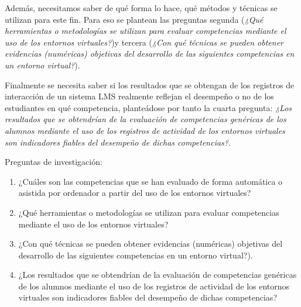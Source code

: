 Además, necesitamos saber de qué forma lo hace, qué métodos y técnicas se utilizan para este fin. Para eso se plantean las preguntas segunda (\emph{¿Qué herramientas o metodologías se utilizan para evaluar competencias mediante el uso de los entornos virtuales?})y tercera (\emph{¿Con qué técnicas se pueden obtener evidencias (numéricas) objetivas del desarrollo de las siguientes competencias en un entorno virtual?}).

Finalmente se necesita saber si los resultados que se obtengan de los registros de interacción de un sistema LMS realmente reflejan el desempeño o no de los estudiantes en qué competencia, planteádose por tanto la cuarta pregunta: \emph{¿Los resultados que se obtendrían de la evaluación de competencias genéricas de los alumnos mediante el uso de los registros de actividad de los entornos virtuales son indicadores fiables del desempeño de dichas competencias?}.

\bigskip
Preguntas de investigación:
\begin{enumerate}
\item ¿Cuáles son las competencias que se han evaluado de forma automática o asistida por ordenador a partir del uso de los entornos virtuales?
\item ¿Qué herramientas o metodologías se utilizan para evaluar competencias mediante el uso de los entornos virtuales?
\item ¿Con qué técnicas se pueden obtener evidencias (numéricas) objetivas del desarrollo de las siguientes competencias en un entorno virtual?).
\item ¿Los resultados que se obtendrían de la evaluación de competencias genéricas de los alumnos mediante el uso de los registros de actividad de los entornos virtuales son indicadores fiables del desempeño de dichas competencias?
\end{enumerate}

